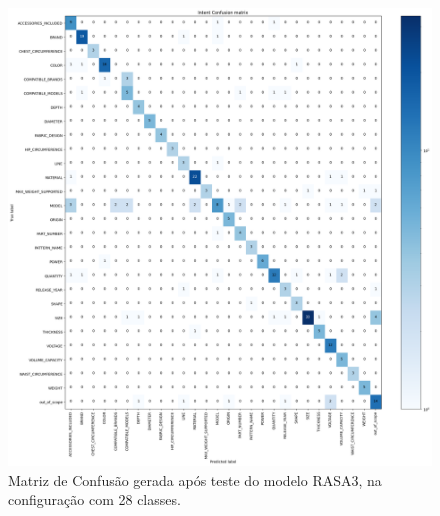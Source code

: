 \begin{figure}[!ht]
    \centering
	\includegraphics[width=1\linewidth]{figuras/RASA3-28_classes.png}
	\caption{Matriz de Confusão gerada após teste do modelo RASA3, na configuração com 28 classes.}
	\label{fig:matriz_rasa3_28_classes}
\end{figure}